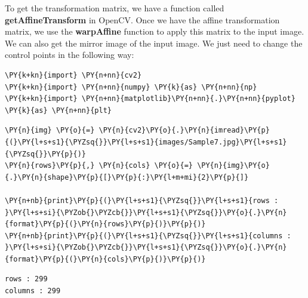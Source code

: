 To get the transformation matrix, we have a function called \textbf{getAffineTransform} in OpenCV. Once we have the affine 	transformation matrix, we use the \textbf{warpAffine} function to apply this matrix to the input image. We can also get the 	mirror image of the input image. We just need to change the control points in the following way:

\vspace{0.5cm}

\begin{tcolorbox}[breakable, size=fbox, boxrule=1pt, pad at break*=1mm,colback=cellbackground, colframe=cellborder]
	\begin{Verbatim}[commandchars=\\\{\}]
\PY{k+kn}{import} \PY{n+nn}{cv2}
\PY{k+kn}{import} \PY{n+nn}{numpy} \PY{k}{as} \PY{n+nn}{np}
\PY{k+kn}{import} \PY{n+nn}{matplotlib}\PY{n+nn}{.}\PY{n+nn}{pyplot} \PY{k}{as} \PY{n+nn}{plt}
	\end{Verbatim}
\end{tcolorbox}

\begin{tcolorbox}[breakable, size=fbox, boxrule=1pt, pad at break*=1mm,colback=cellbackground, colframe=cellborder]
	\begin{Verbatim}[commandchars=\\\{\}]
\PY{n}{img} \PY{o}{=} \PY{n}{cv2}\PY{o}{.}\PY{n}{imread}\PY{p}{(}\PY{l+s+s1}{\PYZsq{}}\PY{l+s+s1}{images/Sample7.jpg}\PY{l+s+s1}{\PYZsq{}}\PY{p}{)}
\PY{n}{rows}\PY{p}{,} \PY{n}{cols} \PY{o}{=} \PY{n}{img}\PY{o}{.}\PY{n}{shape}\PY{p}{[}\PY{p}{:}\PY{l+m+mi}{2}\PY{p}{]}
		
\PY{n+nb}{print}\PY{p}{(}\PY{l+s+s1}{\PYZsq{}}\PY{l+s+s1}{rows : }\PY{l+s+si}{\PYZob{}\PYZcb{}}\PY{l+s+s1}{\PYZsq{}}\PY{o}{.}\PY{n}{format}\PY{p}{(}\PY{n}{rows}\PY{p}{)}\PY{p}{)}
\PY{n+nb}{print}\PY{p}{(}\PY{l+s+s1}{\PYZsq{}}\PY{l+s+s1}{columns : }\PY{l+s+si}{\PYZob{}\PYZcb{}}\PY{l+s+s1}{\PYZsq{}}\PY{o}{.}\PY{n}{format}\PY{p}{(}\PY{n}{cols}\PY{p}{)}\PY{p}{)}
	\end{Verbatim}
\end{tcolorbox}

\begin{Verbatim}[commandchars=\\\{\}]
rows : 299
columns : 299
\end{Verbatim}



